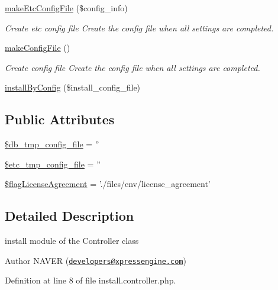 \begin{DoxyCompactItemize}
\hyperlink{classinstallController_a87b331e263614e15c5366284648f6ee0}{make\-Etc\-Config\-File} (\$config\-\_\-info)
\begin{DoxyCompactList}\small\item\em Create etc config file Create the config file when all settings are completed. \end{DoxyCompactList}\item 
\hyperlink{classinstallController_a1ccad92dd450d67e90a2efdde0f6b78a}{make\-Config\-File} ()
\begin{DoxyCompactList}\small\item\em Create config file Create the config file when all settings are completed. \end{DoxyCompactList}\item 
\hyperlink{classinstallController_a4ec44b3090b73660ba018945c2ffa239}{install\-By\-Config} (\$install\-\_\-config\-\_\-file)
\end{DoxyCompactItemize}
\subsection*{Public Attributes}
\begin{DoxyCompactItemize}
\item 
\hyperlink{classinstallController_a1d32cf378279cb2b7d388b8a7e88c7aa}{\$db\-\_\-tmp\-\_\-config\-\_\-file} = ''
\item 
\hyperlink{classinstallController_a8e090f5c9a9844fbd8b4f0855a52dc43}{\$etc\-\_\-tmp\-\_\-config\-\_\-file} = ''
\item 
\hyperlink{classinstallController_af1f7a5fe91be6a576cdffcc07cba5be8}{\$flag\-License\-Agreement} = './files/env/license\-\_\-agreement'
\end{DoxyCompactItemize}


\subsection{Detailed Description}
install module of the Controller class 

\begin{DoxyAuthor}{Author}
N\-A\-V\-E\-R (\href{mailto:developers@xpressengine.com}{\tt developers@xpressengine.\-com}) 
\end{DoxyAuthor}


Definition at line 8 of file install.\-controller.\-php.




